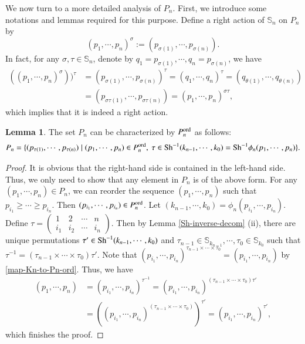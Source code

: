\documentclass[12pt]{amsart}
\theoremstyle{definition}
\newtheorem{lem}[thm]{Lemma}
\newcommand{\s}{\mathbb{S}}
\newcommand{\Sh}{{\rm Sh}}
\newcommand{\ord}{{\rm ord}}
\begin{document}
We now turn to a more detailed analysis of $P_n$. First, we introduce some notations and lemmas required for this purpose. Define a right action of $\s_n$ on $P_n$ by $$(p_1,\cdots, p_n)^\sigma:=(p_{\sigma(1)},\cdots,p_{\sigma(n)}).$$ In fact, for any $\sigma,\tau\in\s_n$, denote by $q_1=p_{\sigma(1)},\cdots,q_n=p_{\sigma(n)}$, we have
\begin{align*}
	((p_1,\cdots,p_n)^\sigma))^\tau&=(p_{\sigma(1)},\cdots, p_{\sigma(n)})^\tau=(q_1,\cdots,q_n)^\tau=(q_{\theta(1)},\cdots, q_{\theta(n)})\\
	&=(p_{\sigma\tau(1)},\cdots, p_{\sigma\tau(n)})=(p_1,\cdots,p_n)^{\sigma\tau},
\end{align*}
which implies that it is indeed  a right action.

\begin{lem}\label{lem-PP} The set  $P_n$ can be characterized by $P^\ord_n$ as follows:
 	\begin{align*}
		P_n=\{(p_{\tau(1)},\cdots, p_{\tau(n)})\mid(p_1,\cdots,p_n)\in P_n^{\ord},~\tau\in \Sh^{-1}(k_{n-1},\cdots,k_0)=\Sh^{-1}\phi_n(p_1,\cdots,p_n)\}.
	\end{align*}
\end{lem}
\begin{proof}
It is obvious that the right-hand side is contained in the left-hand side. Thus, we only need to show that any element in $P_n$ is of the above form.
 For any $(p_1,\cdots,p_n)\in P_n$, we can reorder the sequence $(p_1,\cdots,p_n)$ such that $p_{i_1}\geq \cdots \geq p_{i_n}$. Then  $(p_{i_1},\cdots,p_{i_n})\in P_{n}^{\ord}$. Let $(k_{n-1},\cdots,k_0)= \phi_n(p_{i_1},\cdots,p_{i_n})$. Define $\tau=\begin{pmatrix}
		1 & 2 & \cdots & n \\
		i_1 & i_2 & \cdots & i_n
\end{pmatrix}$. Then by Lemma \ref{Sh-inverse-decom} \textrm{(ii)}, there are unique permutations $\tau'\in\Sh^{-1}(k_{n-1},\cdots,k_0)$ and $\tau_{n-1}\in \mathbb{S}_{k_{n-1}},\cdots,\tau_0\in \mathbb{S}_{k_0}$ such that $\tau^{-1}=(\tau_{n-1}\times\cdots\times\tau_0)\tau'$. Note that  $(p_{i_1},\cdots,p_{i_n})^{\tau_{n-1}\times\cdots\times\tau_0}=(p_{i_1},\cdots,p_{i_n})$ by \eqref{map-Kn-to-Pn-ord}. Thus, we have
\begin{align*}
(p_1,\cdots,p_n)&=(p_{i_1},\cdots,p_{i_n})^{\tau^{-1}}=(p_{i_1},\cdots,p_{i_n})^{(\tau_{n-1}\times\cdots\times\tau_0)\tau'}\\
&=((p_{i_1},\cdots,p_{i_n})^{(\tau_{n-1}\times\cdots\times\tau_0)})^{\tau'}=(p_{i_1},\cdots,p_{i_n})^{\tau'},
\end{align*}
which finishes the proof.
\end{proof}
\end{document}
